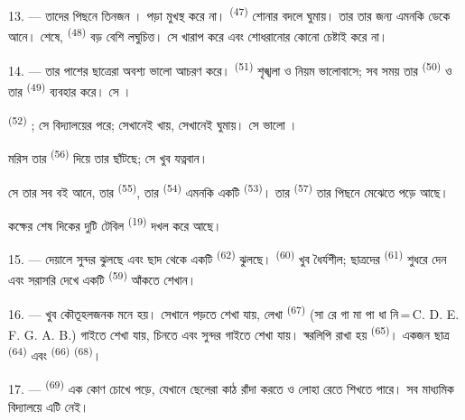13. --- তাদের পিছনে তিনজন ।  পড়া মুখস্থ করে
না।  \textsuperscript{(47)} শোনার বদলে ঘুমায়। তার 
তার জন্য  এমনকি  ডেকে আনে। শেষে,
 \textsuperscript{(48)} বড় বেশি লঘুচিত্ত। সে খারাপ
 করে এবং শোধরানোর কোনো চেষ্টাই করে না।

14. --- তার পাশের ছাত্রেরা অবশ্য ভালো আচরণ করে। 
\textsuperscript{(51)} শৃঙ্খলা ও নিয়ম ভালোবাসে; সব সময় তার 
\textsuperscript{(50)} ও তার  \textsuperscript{(49)} ব্যবহার করে। সে
।

 \textsuperscript{(52)} ; সে বিদ্যালয়ের
 পরে; সেখানেই খায়, সেখানেই ঘুমায়। সে ভালো ।

মরিস তার  \textsuperscript{(56)} দিয়ে তার  ছাঁটছে;
সে খুব যত্নবান।

সে তার সব বই আনে, তার  \textsuperscript{(55)}, তার
 \textsuperscript{(54)} এমনকি একটি 
\textsuperscript{(53)}। তার  \textsuperscript{(57)} তার পিছনে
মেঝেতে পড়ে আছে।

কক্ষের শেষ দিকের দুটি টেবিল  \textsuperscript{(19)}
দখল করে আছে।

\VUsaut{4.6mm}
\VUsaut{3.4mm}

15. ---  দেয়ালে সুন্দর  ঝুলছে এবং ছাদ
থেকে  একটি  \textsuperscript{(62)} ঝুলছে।
 \textsuperscript{(60)} খুব ধৈর্যশীল; ছাত্রদের 
\textsuperscript{(61)} শুধরে দেন এবং সরাসরি দেখে একটি 
\textsuperscript{(59)} আঁকতে শেখান।

16. ---  খুব কৌতূহলজনক মনে হয়। সেখানে
 পড়তে শেখা যায়,  লেখা
 \textsuperscript{(67)} (সা রে গা মা পা ধা নি\,=\,C.
D. E. F. G. A. B.) গাইতে শেখা যায়,  চিনতে এবং সুন্দর
 গাইতে শেখা যায়। স্বরলিপি রাখা হয় 
\textsuperscript{(65)}। একজন ছাত্র  \textsuperscript{(64)}
এবং  \textsuperscript{(66)} 
\textsuperscript{(68)}।

17. ---   \textsuperscript{(69)} এক কোণ
চোখে পড়ে, যেখানে ছেলেরা কাঠ রাঁদা করতে ও লোহা রেতে শিখতে পারে। সব
মাধ্যমিক বিদ্যালয়ে এটি নেই।

